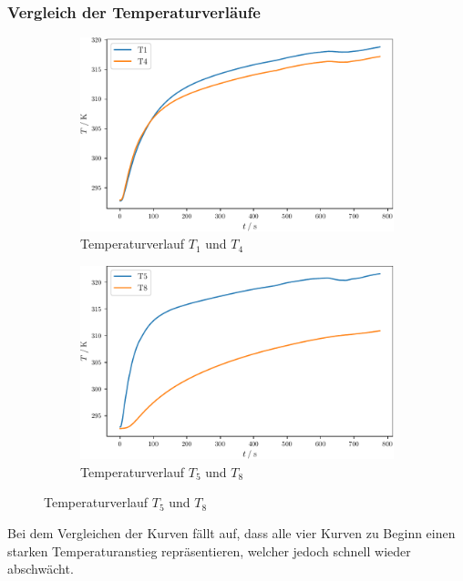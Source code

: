 \subsubsection{Vergleich der Temperaturverläufe}
\begin{figure}
  \label{stat2}
  \begin{subfigure}{0.48\textwidth}
    \centering
    \includegraphics[width = \textwidth]{build/stat14.pdf}
    \caption{Temperaturverlauf $T_1$ und $T_4$}
    \label{fig:stat14}
  \end{subfigure}
  \begin{subfigure}{0.48\textwidth}
    \centering
    \includegraphics[width = \textwidth]{build/stat58.pdf}
    \caption{Temperaturverlauf $T_5$ und $T_8$}
    \label{fig:stat58}
  \end{subfigure}
\end{figure}
Bei dem Vergleichen der Kurven fällt auf, dass alle vier Kurven zu Beginn einen starken Temperaturanstieg repräsentieren, welcher jedoch schnell wieder abschwächt.
